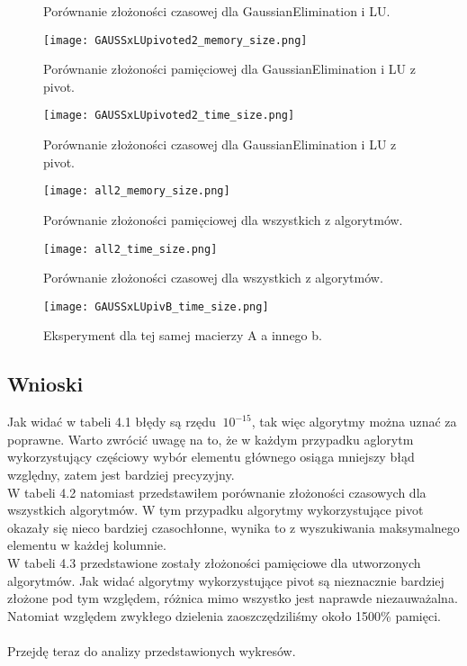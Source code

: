\documentclass[11pt]{article}
\begin{document}
\begin{flushleft}
\begin{figure}[H]
\begin{minipage}[b]{.45\textwidth}
    \caption{Porównanie złożoności czasowej dla GaussianElimination i LU.}
  \end{minipage}
    \begin{minipage}[b]{.45\textwidth}
    \centering
    \texttt{[image: GAUSSxLUpivoted2\_memory\_size.png]}
    \caption{Porównanie złożoności pamięciowej dla GaussianElimination i LU z pivot.}
  \end{minipage}\hfill
  \begin{minipage}[b]{.45\textwidth}
    \centering
    \texttt{[image: GAUSSxLUpivoted2\_time\_size.png]}
    \caption{Porównanie złożoności czasowej dla GaussianElimination i LU z pivot.}
  \end{minipage}
\centering
  \begin{minipage}[b]{.45\textwidth}
    \texttt{[image: all2\_memory\_size.png]}
    \caption{Porównanie złożoności pamięciowej dla wszystkich z algorytmów.}
  \end{minipage}
  \begin{minipage}[b]{.45\textwidth}
\centering
    \texttt{[image: all2\_time\_size.png]}
    \caption{Porównanie złożoności czasowej dla wszystkich z algorytmów.}
  \end{minipage}
  \end{figure}
 \centering
\begin{figure}[!htbp]
\centering
\begin{minipage}[b]{.45\textwidth}
\centering
    \texttt{[image: GAUSSxLUpivB\_time\_size.png]}
    \caption{Eksperyment dla tej samej macierzy A a innego b.}
  \end{minipage}
\end{figure}
\begin{flushleft}
\newpage
\section{Wnioski}
Jak widać w tabeli 4.1 błędy są rzędu $~ 10^{-15}$, tak więc algorytmy można uznać za poprawne.  Warto zwrócić uwagę na to, że w każdym przypadku aglorytm wykorzystujący częściowy wybór elementu głównego osiąga mniejszy błąd względny, zatem jest bardziej precyzyjny. 
\\
W tabeli 4.2 natomiast przedstawiłem porównanie złożoności czasowych dla wszystkich algorytmów. W tym przypadku algorytmy wykorzystujące pivot okazały się nieco bardziej czasochłonne, wynika to z wyszukiwania maksymalnego elementu w każdej kolumnie.
\\ W tabeli 4.3 przedstawione zostały złożoności pamięciowe dla utworzonych algorytmów. Jak widać algorytmy wykorzystujące pivot są nieznacznie bardziej złożone pod tym względem, różnica mimo wszystko jest naprawde niezauważalna. Natomiat względem zwykłego dzielenia zaoszczędziliśmy około 1500\% pamięci.\\\ 
\bigskip
\\
Przejdę teraz do analizy przedstawionych wykresów.


\end{flushleft}
\end{flushleft}
\end{document}
